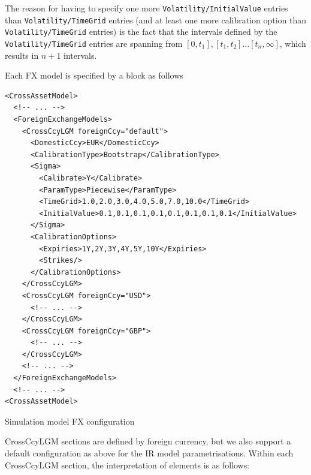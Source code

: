 \documentclass[12pt, a4paper]{article}
\begin{document}
{The reason for having to specify one more {\tt Volatility/InitialValue} entries than {\tt Volatility/TimeGrid} entries (and at least one more calibration option than {\tt Volatility/TimeGrid} entries) is the fact that the intervals defined by the {\tt Volatility/TimeGrid} entries are spanning from $[0,t_1],[t_1,t_2]\ldots[t_n,\infty]$, which results in $n+1$ intervals.

\medskip

Each FX model is specified by a block as follows

\begin{listing}[H]
\begin{verbatim}
<CrossAssetModel>	
  <!-- ... -->
  <ForeignExchangeModels>
    <CrossCcyLGM foreignCcy="default">
      <DomesticCcy>EUR</DomesticCcy>
      <CalibrationType>Bootstrap</CalibrationType>
      <Sigma>
        <Calibrate>Y</Calibrate>
        <ParamType>Piecewise</ParamType>
        <TimeGrid>1.0,2.0,3.0,4.0,5.0,7.0,10.0</TimeGrid>
        <InitialValue>0.1,0.1,0.1,0.1,0.1,0.1,0.1,0.1</InitialValue>
      </Sigma>
      <CalibrationOptions>
        <Expiries>1Y,2Y,3Y,4Y,5Y,10Y</Expiries>
        <Strikes/>
      </CalibrationOptions>
    </CrossCcyLGM>
    <CrossCcyLGM foreignCcy="USD">
      <!-- ... -->
    </CrossCcyLGM>
    <CrossCcyLGM foreignCcy="GBP">
      <!-- ... -->
    </CrossCcyLGM>
    <!-- ... -->
  </ForeignExchangeModels>
  <!-- ... -->
<CrossAssetModel>	
\end{verbatim}
\caption{Simulation model FX configuration}
\label{lst:simulation_model_fx_configuration}
\end{listing}

CrossCcyLGM sections are defined by foreign currency, but we also support a default configuration as above for the IR
model parametrisations.  Within each CrossCcyLGM section, the interpretation of elements is as follows:

}
\end{document}
